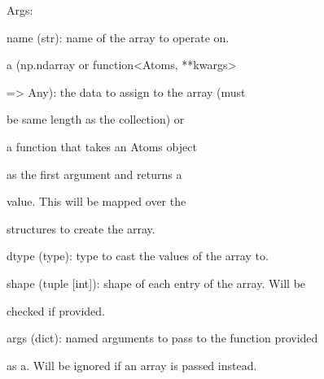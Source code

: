 \documentclass[letterpaper,10pt,english]{sphinxmanual}
\begin{document}
\begin{fulllineitems}
\begin{fulllineitems}
\begin{DUlineblock}{0em}
\item[] Args:
\item[]
\begin{DUlineblock}{\DUlineblockindent}
\item[] name (str): name of the array to operate on.
\item[] a (np.ndarray or function\textless{}Atoms, **kwargs\textgreater{}
\item[]
\begin{DUlineblock}{\DUlineblockindent}
\item[] =\textgreater{} Any): the data to assign to the array (must
\item[]
\begin{DUlineblock}{\DUlineblockindent}
\item[] be same length as the collection) or
\item[] a function that takes an Atoms object
\item[] as the first argument and returns a
\item[] value. This will be mapped over the
\item[] structures to create the array.
\end{DUlineblock}
\end{DUlineblock}
\item[] dtype (type): type to cast the values of the array to.
\item[] shape (tuple {[}int{]}): shape of each entry of the array. Will be
\item[]
\begin{DUlineblock}{\DUlineblockindent}
\item[] checked if provided.
\end{DUlineblock}
\item[] args (dict): named arguments to pass to the function provided
\item[]
\begin{DUlineblock}{\DUlineblockindent}
\item[] as a. Will be ignored if an array is passed instead.
\end{DUlineblock}
\end{DUlineblock}
\end{DUlineblock}

\end{fulllineitems}



\end{fulllineitems}
\end{document}
